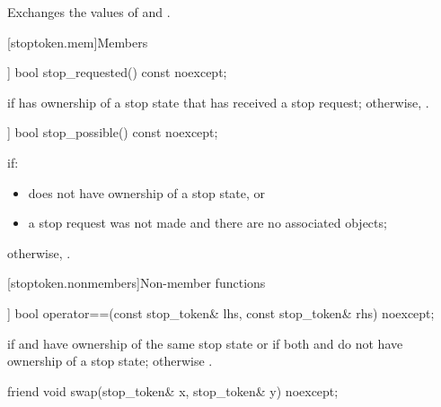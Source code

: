 \begin{itemdescr}
\pnum
\effects
Exchanges the values of  and .
\end{itemdescr}

[stoptoken.mem]{Members}

%
\begin{itemdecl}
[[nodiscard]] bool stop_requested() const noexcept;
\end{itemdecl}

\begin{itemdescr}
\pnum
\returns
{} if  has ownership of a stop state
that has received a stop request;
otherwise, .
\end{itemdescr}

%
\begin{itemdecl}
[[nodiscard]] bool stop_possible() const noexcept;
\end{itemdecl}

\begin{itemdescr}
\pnum
\returns
{} if:
\begin{itemize}
\item {} does not have ownership of a stop state, or
\item a stop request was not made
      and there are no associated  objects;
\end{itemize}
otherwise, .
\end{itemdescr}

[stoptoken.nonmembers]{Non-member functions}

%
\begin{itemdecl}
[[nodiscard]] bool operator==(const stop_token& lhs, const stop_token& rhs) noexcept;
\end{itemdecl}

\begin{itemdescr}
\pnum
\returns
{} if  and  have ownership of the same stop state
or if both  and  do not have ownership of a stop state;
otherwise .
\end{itemdescr}

%
\begin{itemdecl}
friend void swap(stop_token& x, stop_token& y) noexcept;
\end{itemdecl}

